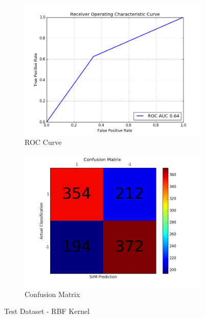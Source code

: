 \begin{figure}[h]
	
	\begin{subfigure}{0.5\textwidth}
		\includegraphics[width=0.9\linewidth]{images/AUC-TestDataset-rbf} 
		\caption{ROC Curve}
		\label{fig:AUC_TestDataset_rbf}
	\end{subfigure}
	\begin{subfigure}{0.5\textwidth}
		\includegraphics[width=0.9\linewidth]{images/CM-TestDataset-rbf}
		\caption{Confusion Matrix}
		\label{fig:CM_TestDataset_rbf}
	\end{subfigure}
	
	\caption{Test Dataset - RBF Kernel}
	\label{fig:TestDataset_rbf_results}
\end{figure}


